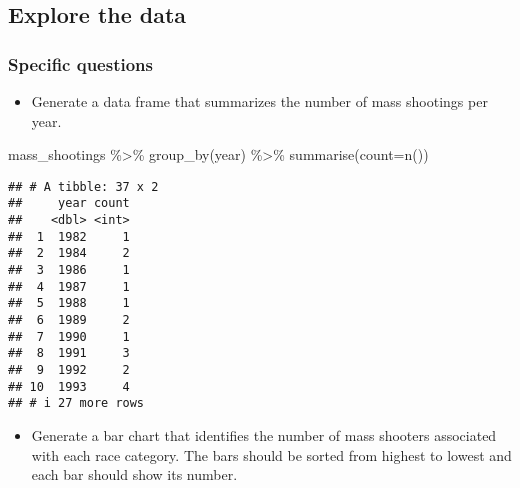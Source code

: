 \documentclass[
]{article}
\newenvironment{Shaded}{\begin{snugshade}}{\end{snugshade}}
\newcommand{\AttributeTok}[1]{\textcolor[rgb]{0.77,0.63,0.00}{#1}}
\newcommand{\FunctionTok}[1]{\textcolor[rgb]{0.00,0.00,0.00}{#1}}
\newcommand{\NormalTok}[1]{#1}
\newcommand{\SpecialCharTok}[1]{\textcolor[rgb]{0.00,0.00,0.00}{#1}}
\providecommand{\tightlist}{%
  \setlength{\itemsep}{0pt}\setlength{\parskip}{0pt}}
\begin{document}
\hypertarget{explore-the-data}{%
\subsection{Explore the data}\label{explore-the-data}}

\hypertarget{specific-questions}{%
\subsubsection{Specific questions}\label{specific-questions}}

\begin{itemize}
\tightlist
\item
  Generate a data frame that summarizes the number of mass shootings per
  year.
\end{itemize}

\begin{Shaded}
\begin{Highlighting}[]
\NormalTok{mass\_shootings }\SpecialCharTok{\%\textgreater{}\%}
  \FunctionTok{group\_by}\NormalTok{(year) }\SpecialCharTok{\%\textgreater{}\%}
  \FunctionTok{summarise}\NormalTok{(}\AttributeTok{count=}\FunctionTok{n}\NormalTok{())}
\end{Highlighting}
\end{Shaded}

\begin{verbatim}
## # A tibble: 37 x 2
##     year count
##    <dbl> <int>
##  1  1982     1
##  2  1984     2
##  3  1986     1
##  4  1987     1
##  5  1988     1
##  6  1989     2
##  7  1990     1
##  8  1991     3
##  9  1992     2
## 10  1993     4
## # i 27 more rows
\end{verbatim}

\begin{itemize}
\tightlist
\item
  Generate a bar chart that identifies the number of mass shooters
  associated with each race category. The bars should be sorted from
  highest to lowest and each bar should show its number.
\end{itemize}
\end{document}
